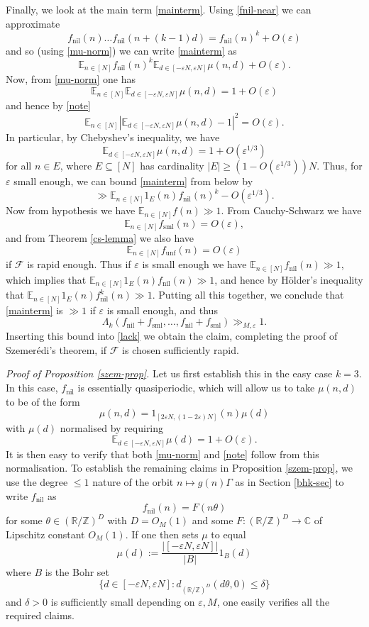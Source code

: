 \documentclass[11pt,reqno]{amsart}
\numberwithin{equation}{section}
\theoremstyle{plain}
\theoremstyle{definition}
\renewcommand{\leq}{\leqslant}
\renewcommand{\geq}{\geqslant}
\newcommand\E{{\mathbb{E}}}
\newcommand\Z{\mathbb{Z}}
\newcommand\R{\mathbb{R}}
\newcommand\C{\mathbb{C}}
\newcommand\1{{\bf 1}}
\newcommand\2{{\bf 2}}
\newcommand\eps{\varepsilon}
\newcommand\nil{{\operatorname{nil}}}
\newcommand\sml{{\operatorname{sml}}}
\newcommand\unf{{\operatorname{unf}}}
\newcommand\Grow{{\mathcal F}}
\begin{document}
Finally, we look at the main term \eqref{mainterm}.  Using \eqref{fnil-near} we can approximate
$$ f_\nil(n) \ldots f_\nil (n+(k-1)d) = f_\nil(n)^k + O(\eps)$$
and so (using \eqref{mu-norm}) we can write \eqref{mainterm} as
$$ \E_{n \in [N]} f_\nil(n)^k \E_{d \in [-\eps N,\eps N]} \mu(n,d) + O(\eps).$$
Now, from \eqref{mu-norm} one has
$$ \E_{n \in [N]} \E_{d \in [-\eps N,\eps N]} \mu(n,d) = 1 + O(\eps)$$
and hence by \eqref{note}
$$ \E_{n \in [N]} |\E_{d \in [-\eps N,\eps N]} \mu(n,d) - 1|^2 = O(\eps).$$
In particular, by Chebyshev's inequality, we have
$$ \E_{d \in [-\eps N,\eps N]} \mu(n,d) = 1 + O(\eps^{1/3})$$
for all $n \in E$, where $E \subseteq [N]$ has cardinality $|E| \geq (1-O(\eps^{1/3})) N$.  Thus, for $\eps$ small enough, we can bound \eqref{mainterm} from below by
$$ \gg \E_{n\in [N]} 1_E(n) f_\nil(n)^k - O(\eps^{1/3}).$$
Now from hypothesis we have $\E_{n \in [N]} f(n) \gg 1$.  From Cauchy-Schwarz we have \[ \E_{n \in [N]} f_\sml(n) = O(\eps),\] and from Theorem \ref{cs-lemma} we also have \[ \E_{n \in [N]} f_\unf(n) = O(\eps)\] if $\Grow$ is rapid enough.  Thus if $\eps$ is small enough we have $\E_{n \in [N]} f_\nil(n) \gg 1$,
which implies that
$ \E_{n \in [N]} 1_E(n) f_\nil(n) \gg 1$, and hence by H\"older's inequality that
$ \E_{n \in [N]} 1_E(n) f_\nil^k(n) \gg 1$.
Putting all this together, we conclude that \eqref{mainterm} is $\gg 1$ if $\eps$ is small enough, and thus
$$  \Lambda_k(f_\nil+f_\sml,\ldots,f_\nil+f_\sml) \gg_{M,\eps} 1.$$
Inserting this bound into \eqref{lack} we obtain the claim, completing the proof of Szemer\'edi's theorem,  if $\Grow$ is chosen sufficiently rapid.\vspace{11pt}

\emph{Proof of Proposition \ref{szem-prop}.}  Let us first establish this in the easy case $k=3$.  In this case, $f_\nil$ is essentially quasiperiodic, which will allow us to take $\mu(n,d)$ to be of the form 
$$ \mu(n,d) = 1_{[2\eps N, (1-2\eps)N]}(n) \mu(d)$$
with $\mu(d)$ normalised by requiring
$$ \E_{d \in [-\eps N,\eps N]} \mu(d) = 1 + O(\eps).$$
It is then easy to verify that both \eqref{mu-norm} and \eqref{note} follow from this normalisation.  To establish the remaining claims in Proposition \ref{szem-prop}, we use the degree $\leq 1$ nature of the orbit $n \mapsto g(n) \Gamma$ as in Section \ref{bhk-sec} to write $f_\nil$ as
$$ f_\nil(n) = F( n \theta )$$
for some $\theta \in (\R/\Z)^D$ with $D = O_M(1)$ and some $F: (\R/\Z)^D \to \C$ of Lipschitz constant $O_M(1)$.  If one then sets $\mu$ to equal
$$ \mu(d) := \frac{|[-\eps N,\eps N]|}{|B|} 1_B(d)$$
where $B$ is the Bohr set
$$ \{ d \in [-\eps N,\eps N]: d_{(\R/\Z)^D}(d\theta, 0) \leq \delta \}$$
and $\delta > 0$ is sufficiently small depending on $\eps, M$, one easily verifies all the required claims.
\end{document}
